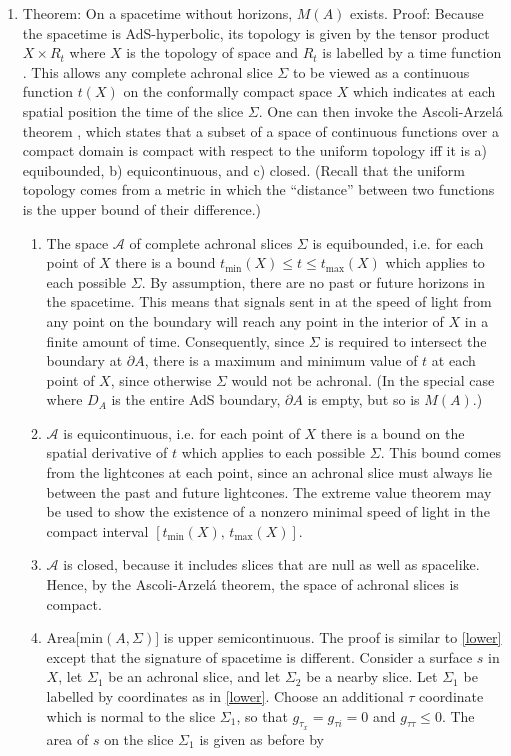 \documentclass[12pt]{article}
\begin{document}
\begin{enumerate}[resume]
\item \label{Mexists} Theorem: On a spacetime without horizons, $M(A)$ exists.  Proof: Because the spacetime is AdS-hyperbolic, its topology is given by the tensor product $X \times R_t$ where $X$ is the topology of space and $R_t$ is labelled by a time function \cite{geroch67}.  This allows any complete achronal slice $\Sigma$ to be viewed as a continuous function $t(X)$ on the conformally compact space $X$ which indicates at each spatial position the time of the slice $\Sigma$.  One can then invoke the Ascoli-Arzel\'{a} theorem \cite{AA}, which states that a subset of a space of continuous functions over a compact domain is compact with respect to the uniform topology iff it is a) equibounded, b) equicontinuous, and c) closed.  (Recall that the uniform topology comes from a metric in which the ``distance'' between two functions is the upper bound of their difference.)
	\begin{enumerate}
	\item \label{equib} The space $\mathcal{A}$ of complete achronal slices $\Sigma$ is equibounded, i.e. for each point of $X$ there is a bound $t_\mathrm{min}(X) \le t \le t_\mathrm{max}(X)$ which applies to each possible $\Sigma$.  By assumption, there are no past or future horizons in the spacetime.  This means that signals sent in at the speed of light from any point on the boundary will reach any point in the interior of $X$ in a finite amount of time.  Consequently, since $\Sigma$ is required to intersect the boundary at $\partial A$, there is a maximum and minimum value of $t$ at each point of $X$, since otherwise $\Sigma$ would not be achronal.  (In the special case where $D_A$ is the entire AdS boundary, $\partial A$ is empty, but so is $M(A)$.)
	\item $\mathcal{A}$ is equicontinuous, i.e. for each point of $X$ there is a bound on the spatial derivative of $t$ which applies to each possible $\Sigma$.  This bound comes from the lightcones at each point, since an achronal slice must always lie between the past and future lightcones.  The extreme value theorem may be used to show the existence of a nonzero minimal speed of light in the compact interval $[t_\mathrm{min}(X),\, t_\mathrm{max}(X)]$.
	\item $\mathcal{A}$ is closed, because it includes slices that are null as well as spacelike.  Hence, by the Ascoli-Arzel\'{a} theorem, the space of achronal slices is compact.
	\item \label{upper} $\mathrm{Area[min}(A,\Sigma)]$ is upper semicontinuous.  The proof is similar to \ref{lower} except that the signature of spacetime is different.  Consider a surface $s$ in $X$, let $\Sigma_1$ be an achronal slice, and let $\Sigma_2$ be a nearby slice.  Let $\Sigma_1$ be labelled by coordinates as in \ref{lower}.  Choose an additional $\tau$ coordinate which is normal to the slice $\Sigma_1$, so that $g_{\tau_x} = g_{\tau i} = 0$ and $g_{\tau\tau} \le 0$.   The area of $s$ on the slice $\Sigma_1$ is given as before by

\end{enumerate}
\end{enumerate}
\end{document}
